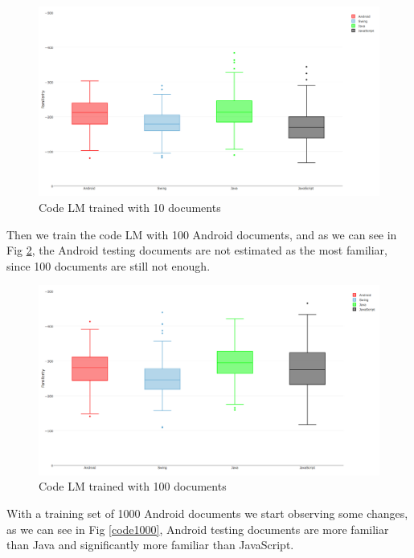 \documentclass[12pt,mscthesis]{usiinfthesis}
\begin{document}
{\begin{figure}[H]
			\centering
			\includegraphics[width=\textwidth]{code10}
			\caption{Code LM trained with 10 documents}
			\label{code10}
			\end{figure}

Then we train the code LM with 100 Android documents, and as we can see in Fig \ref{code100}, the Android testing documents are not estimated as the most familiar, since 100 documents are still not enough.

\begin{figure}[H]
			\centering
			\includegraphics[width=\textwidth]{code100}
			\caption{Code LM trained with 100 documents}
			\label{code100}
			\end{figure}		
\newpage

With a training set of 1000 Android documents we start observing some changes, as we can see in Fig \ref{code1000}, Android testing documents are more familiar than Java and significantly more familiar than JavaScript.

}
\end{document}
